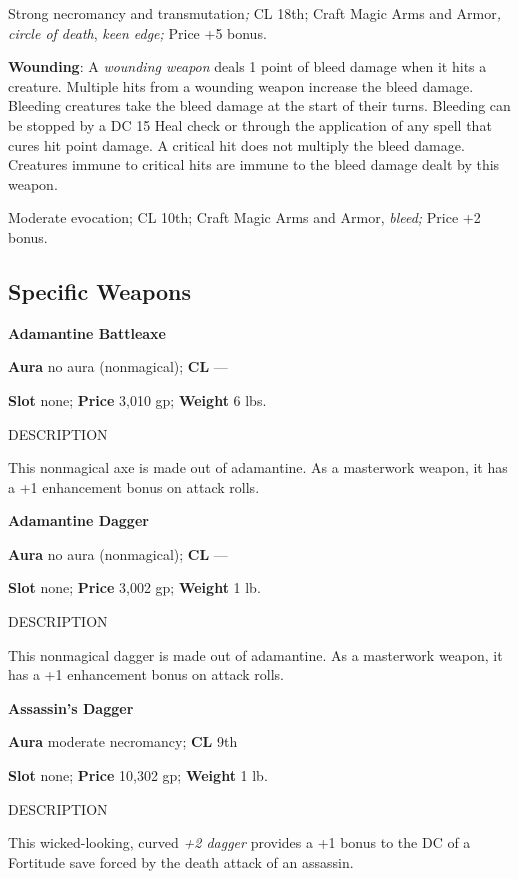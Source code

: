 Strong necromancy and transmutation\textit{; }CL 18th; Craft Magic Arms and Armor\textit{, circle of death}, \textit{keen edge; }Price +5 bonus.
				
\textbf{Wounding}: A \textit{wounding weapon} deals 1 point of bleed damage when it hits a creature. Multiple hits from a wounding weapon increase the bleed damage. Bleeding creatures take the bleed damage at the start of their turns. Bleeding can be stopped by a DC 15 Heal check or through the application of any spell that cures hit point damage. A critical hit does not multiply the bleed damage. Creatures immune to critical hits are immune to the bleed damage dealt by this weapon.
				
Moderate evocation; CL 10th; Craft Magic Arms and Armor, \textit{bleed; }Price +2 bonus.
				
\subsection{Specific Weapons}

				
\textbf{Adamantine Battleaxe}
				
\textbf{Aura} no aura (nonmagical);\textbf{ CL }---
				
\textbf{Slot} none; \textbf{Price} 3,010 gp; \textbf{Weight} 6 lbs.
				
DESCRIPTION
				
This nonmagical axe is made out of adamantine. As a masterwork weapon, it has a +1 enhancement bonus on attack rolls. 
				
\textbf{Adamantine Dagger}
				
\textbf{Aura} no aura (nonmagical); \textbf{CL} ---
				
\textbf{Slot} none; \textbf{Price} 3,002 gp; \textbf{Weight} 1 lb.
				
DESCRIPTION
				
This nonmagical dagger is made out of adamantine. As a masterwork weapon, it has a +1 enhancement bonus on attack rolls. 
				
\textbf{Assassin's Dagger}
				
\textbf{Aura} moderate necromancy;\textbf{ CL }9th
				
\textbf{Slot} none; \textbf{Price} 10,302 gp; \textbf{Weight} 1 lb.
				
DESCRIPTION
				
This wicked-looking, curved \textit{+2 dagger} provides a +1 bonus to the DC of a Fortitude save forced by the death attack of an assassin. 
				
